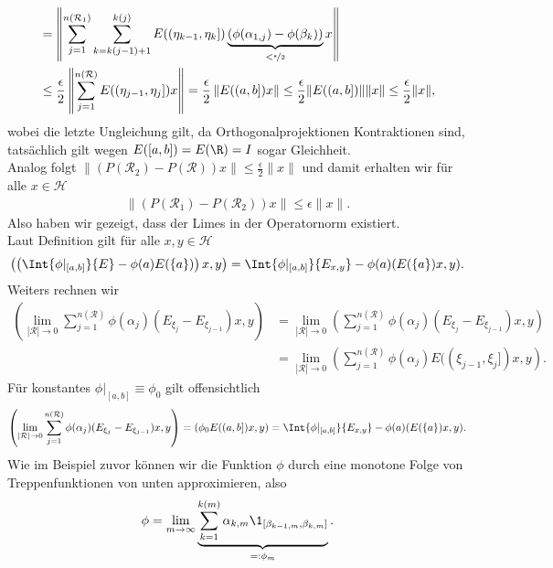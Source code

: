 \begin{solution}
\begin{align*}
  &= \left\|
  \sum_{j=1}^{n(\mathcal{R}_1)}\sum_{k =k(j-1)+1}^{k(j)}
  E((\eta_{k-1},\eta_{k}])
  \underbrace{(\phi(\alpha_{1,j}) - \phi(\beta_k))}_{<\nicefrac{\epsilon}{2}}x\right\| \\
  &\leq \frac{\epsilon}{2}\left\|
  \sum_{j=1}^{n(\mathcal{R})}
  E((\eta_{j-1},\eta_{j}])x\right\|
  = \frac{\epsilon}{2}\left\|E((a,b])x\right\| \leq \frac{\epsilon}{2}\|E((a,b])\|\|x\|
  \leq \frac{\epsilon}{2}\|x\|,
\end{align*}
wobei die letzte Ungleichung gilt, da Orthogonalprojektionen Kontraktionen sind, tatsächlich gilt wegen $E([a, b]) = E(\R) = I$ sogar Gleichheit. \\
Analog folgt $\|(P(\mathcal{R}_2) - P(\mathcal{R}))x\| \leq \frac{\epsilon}{2}\|x\|$
und damit erhalten wir für alle $x \in \mathcal{H}$
\begin{align*}
  \|(P(\mathcal{R}_1) - P(\mathcal{R}_2))x\| \leq \epsilon\|x\|.
\end{align*}
Also haben wir gezeigt, dass der Limes in der Operatornorm existiert. \\
Laut Definition gilt für alle $x,y \in \mathcal{H}$
\begin{align*}
  \left(\left(\Int{\phi|_{[a,b]}}{E} - \phi(a) E(\{a\})\right)x,y\right) =
  \Int{\phi|_{[a,b]}}{E_{x,y}} - \phi(a)(E(\{a\})x,y).
\end{align*}
Weiters rechnen wir
\begin{align*}
  \left(\lim_{|\mathcal{R}| \to 0}\sum_{j=1}^{n(\mathcal{R})}
  \phi(\alpha_j)(E_{\xi_j} - E_{\xi_{j-1}})x,y\right) &=
  \lim_{|\mathcal{R}| \to 0}
  \left(\sum_{j=1}^{n(\mathcal{R})}\phi(\alpha_j)(E_{\xi_j} - E_{\xi_{j-1}})x,y\right) \\
  &= \lim_{|\mathcal{R}| \to 0}
  \left(\sum_{j=1}^{n(\mathcal{R})}\phi(\alpha_j)E((\xi_{j-1},\xi_j])x,y\right).
\end{align*}
Für konstantes $\phi|_{[a,b]} \equiv \phi_0$ gilt offensichtlich
\begin{align*}
  \left(\lim_{|\mathcal{R}| \to 0}\sum_{j=1}^{n(\mathcal{R})}
  \phi(\alpha_j)(E_{\xi_j} - E_{\xi_{j-1}})x,y\right) =
  (\phi_0E((a,b])x,y) = \Int{\phi|_{[a,b]}}{E_{x,y}} - \phi(a)(E(\{a\})x,y).
\end{align*}
Wie im Beispiel zuvor können wir die Funktion $\phi$ durch eine monotone Folge
von Treppenfunktionen von unten approximieren, also
\begin{align*}
  \phi = \lim_{m \to \infty}\underbrace{\sum_{k=1}^{k(m)}\alpha_{k,m}
  \1_{[\beta_{k-1,m},\beta_{k,m}]}}_{=: \phi_m}.
\end{align*}

\end{solution}

